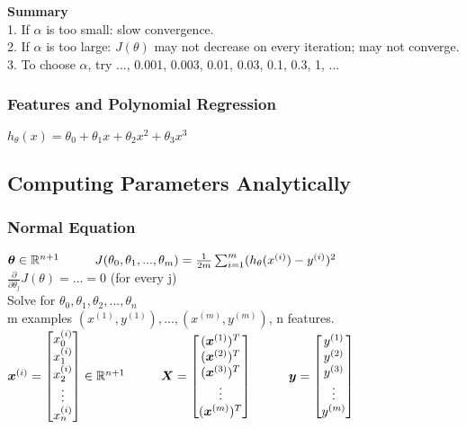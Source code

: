 \documentclass{article}
\newcommand\tab[1][1cm]{\hspace*{#1}}
\newcommand{\vect}[1]{\boldsymbol{#1}}
\begin{document}
\textbf{Summary}\\
1. If $\alpha$ is too small: slow convergence. \\
2. If $\alpha$ is too large: $J(\theta)$ may not decrease on every iteration; may not converge. \\
3. To choose $\alpha$, try ..., 0.001, 0.003, 0.01, 0.03, 0.1, 0.3, 1, ... 

\subsubsection{Features and Polynomial Regression}
$h_\theta(x) = \theta_0 + \theta_1 x + \theta_2 x^2 + \theta_3 x^3$ \\

\newpage

\subsection{Computing Parameters Analytically}
\subsubsection{Normal Equation}
$\vect{\theta} \in \mathbb{R}^{n+1} \tab J(\theta_0, \theta_1, ..., \theta_m) = \frac{1}{2m}\sum_{i=1}^{m}(h_\theta(x^{(i)}) - y^{(i)})^2$ \\

$\frac{\partial}{\partial \theta_j}J(\theta) = ... = 0$ (for every j) \\

Solve for $\theta_0, \theta_1, \theta_2, ... ,\theta_n$ \\

m examples $(x^{(1)}, y^{(1)}), ..., (x^{(m)}, y^{(m)})$, n features. \\
$\vect{x}^{(i)} = \begin{bmatrix}
x_0^{(i)} \\ x_1^{(i)} \\ x_2^{(i)} \\ \vdots \\ x_n^{(i)}
\end{bmatrix} \in \mathbb{R}^{n+1}
\tab
\vect{X} = \begin{bmatrix}
(\vect{x}^{(1)})^T \\ (\vect{x}^{(2)})^T \\ (\vect{x}^{(3)})^T\\ \vdots \\ (\vect{x}^{(m)})^T
\end{bmatrix}
\tab
\vect{y} = \begin{bmatrix}
y^{(1)} \\ y^{(2)} \\ y^{(3)} \\ \vdots \\ y^{(m)}
\end{bmatrix}
$\\\\
\end{document}
